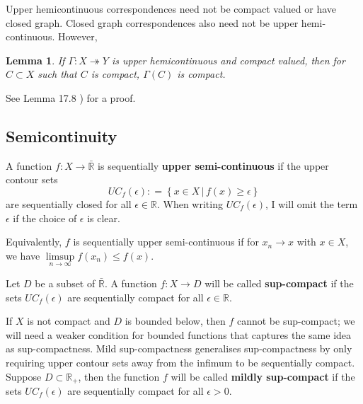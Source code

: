 \documentclass[12pt]{ectaart}
\newcommand{\1}{\mathbbm 1}
\theoremstyle{plain}
\newtheorem{lemma}{Lemma}[section]
\theoremstyle{definition}
\begin{document}
Upper hemicontinuous correspondences need not be compact valued or have closed graph. Closed graph correspondences also need not be upper hemi-continuous. However, 

\begin{lemma}
	If $\Gamma\colon X\twoheadrightarrow Y$ is upper hemicontinuous and compact valued, then for $C\subset X$ such that $C$ is compact, $\Gamma(C)$ is compact. 
\end{lemma}
	
	See Lemma 17.8  \cite{Aliprantis2005}) for a proof. 

\subsection{Semicontinuity}\label{sec: semicont}

A function $f\colon X\rightarrow \bar{\mathbb{R}}$ is  sequentially \textbf{upper semi-continuous} if the upper contour sets 
%
\begin{equation}
UC_f(\epsilon)\colon= \left\{x\in X\,\vert\, f\left(x\right) \geq \epsilon \right\}
\end{equation}
%
are sequentially closed for all $\epsilon\in \mathbb{R}$. When writing $UC_{f}(\epsilon)$, I will omit the term $\epsilon$ if the choice of $\epsilon$ is clear.

Equivalently, $f$ is sequentially upper semi-continuous if for $x_{n}\rightarrow x$ with $x\in X$, we have $\limsup\limits_{n\rightarrow \infty} f(x_{n}) \leq f(x)$. 

Let $D$ be a subset of $\bar{\mathbb{R}}$. A function $f\colon X \rightarrow D$ will be called  \textbf{sup-compact} if the sets $UC_{f}(\epsilon)$ are  sequentially compact for all $\epsilon\in \mathbb{R}$. 

If $X$ is not compact and $D$ is bounded below, then $f$ cannot be sup-compact; we will need a weaker condition for bounded functions that captures the same idea as sup-compactness.  Mild sup-compactness generalises sup-compactness by only requiring upper contour sets away from the infimum to be sequentially compact. Suppose $D \subset \mathbb{R}_{+}$, then the function $f$ will be called \textbf{mildly sup-compact} if the sets $UC_{f}(\epsilon)$ are  sequentially compact for all $\epsilon > 0$. 
\end{document}
